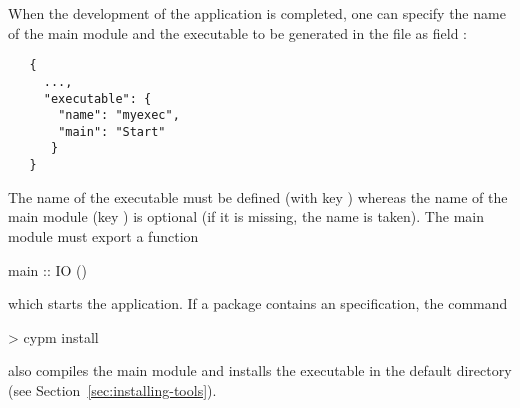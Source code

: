 When the development of the application is completed,
one can specify the name of the main module and the executable
to be generated in the file 
as field :
%
\begin{verbatim}
   {
     ...,
     "executable": {
       "name": "myexec",
       "main": "Start"
      }
   }
\end{verbatim}
%
The name of the executable must be defined (with key )
whereas the name of the main module (key ) is optional
(if it is missing, the name  is taken).
The main module must export a function
%
\begin{curry}
main :: IO ()
\end{curry}
%
which starts the application.
If a package contains an  specification,
the command
%
\begin{curry}
> cypm install
\end{curry}
%
also compiles the main module and installs the executable
in the default directory
 (see Section~\ref{sec:installing-tools}).



